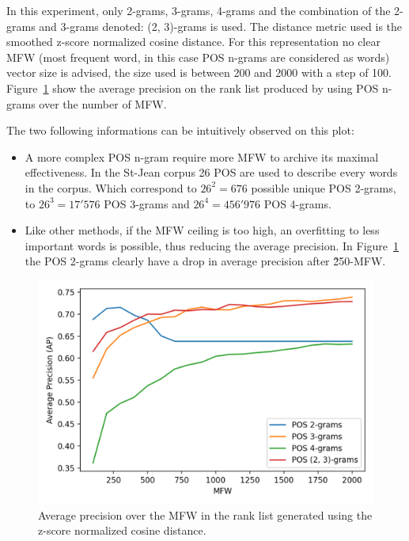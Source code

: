 In this experiment, only 2-grams, 3-grams, 4-grams and the combination of the 2-grams and 3-grams denoted: (2, 3)-grams is used.
The distance metric used is the smoothed z-score normalized cosine distance.
For this representation no clear MFW (most frequent word, in this case POS n-grams are considered as words) vector size is advised, the size used is between 200 and 2000 with a step of 100.
Figure~\ref{fig:pos_ngrams} show the average precision on the rank list produced by using POS n-grams over the number of MFW.

The two following informations can be intuitively observed on this plot:
\begin{itemize}
  \item
  A more complex POS n-gram require more MFW to archive its maximal effectiveness.
  In the St-Jean corpus 26 POS are used to describe every words in the corpus.
  Which correspond to $26^2 = 676$ possible unique POS 2-grams, to $26^3 = 17'576$ POS 3-grams and $26^4 = 456'976$ POS 4-grams.
  \item
  Like other methods, if the MFW ceiling is too high, an overfitting to less important words is possible, thus reducing the average precision.
  In Figure~\ref{fig:pos_ngrams} the POS 2-grams clearly have a drop in average precision after \~250-MFW.
\end{itemize}

\begin{figure}
  \centering
  \caption{Average precision over the MFW in the rank list generated using the z-score normalized cosine distance.}
  \label{fig:pos_ngrams}
  \includegraphics[width=\linewidth]{img/pos_ngrams.png}
\end{figure}


